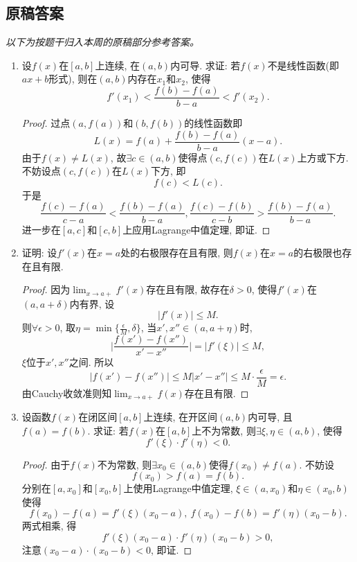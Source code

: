 \documentclass[UTF8,11pt, a4paper, oneside, fontset=none]{ctexbook}
\begin{document}
\clearpage

\subsection*{原稿答案}

\noindent\emph{以下为按题干归入本周的原稿部分参考答案。}

\begin{enumerate}
\item 设$f(x)$在$[a, b]$上连续, 在$(a, b)$内可导. 求证: 若$f(x)$不是线性函数(即$ax+b$形式), 则在$(a, b)$内存在$x_1$和$x_2$, 使得
\[
f'(x_1) < \frac{f(b) - f(a)}{b-a} < f'(x_2).
\]

\begin{proof}

过点$(a, f(a))$和$(b, f(b))$的线性函数即
\[
L(x) = f(a) + \frac{f(b) - f(a)}{b-a} (x-a).
\]
由于$f(x) \neq L(x)$, 故$\exists c \in (a, b)$使得点$(c, f(c))$在$L(x)$上方或下方. 不妨设点$(c, f(c))$在$L(x)$下方, 即
\[
f(c) < L(c).
\]
于是
\[
 \frac{f(c) - f(a)}{c-a} <  \frac{f(b) - f(a)}{b-a},  \frac{f(c) - f(b)}{c-b} >  \frac{f(b) - f(a)}{b-a}.
\]
进一步在$[a, c]$和$[c, b]$上应用Lagrange中值定理, 即证.

\end{proof}



\item 证明: 设$f'(x)$在$x=a$处的右极限存在且有限, 则$f(x)$在$x=a$的右极限也存在且有限.


\begin{proof}

因为$\lim_{x \to a+} f'(x)$存在且有限, 故存在$\delta> 0$, 使得$f'(x)$在$(a, a+\delta)$内有界, 设
\[
|f'(x)| \leq M.
\]
则$\forall \epsilon >0$, 取$\eta = \min \{ \frac{\epsilon}{M}, \delta \}$, 当$x', x'' \in (a, a + \eta)$时,
\[
\Big| \frac{f(x') - f(x'')}{x' - x''} \Big| = |f'(\xi)| \leq M,
\]
$\xi$位于$x', x''$之间. 所以
\[
|f(x') - f(x'')| \leq M|x' - x''| \leq M \cdot \frac{\epsilon}{M} = \epsilon.
\]
由Cauchy收敛准则知$\lim_{x \to a+}f(x)$存在且有限.
\end{proof}



\item 设函数$f(x)$在闭区间$[a, b]$上连续, 在开区间$(a, b)$内可导, 且$f(a) = f(b)$. 求证: 若$f(x)$在$[a, b]$上不为常数, 则$\exists \xi, \eta \in (a, b)$, 使得
\[
f'(\xi) \cdot f'(\eta) <0.
\]


\begin{proof}

由于$f(x)$不为常数, 则$\exists x_0 \in (a, b)$使得$f(x_0) \neq f(a)$. 不妨设
\[
f(x_0) > f(a) = f(b).
\]
分别在$[a, x_0]$和$[x_0, b]$上使用Lagrange中值定理, $\xi \in (a, x_0)$和$\eta \in (x_0, b)$使得
\[
f(x_0) - f(a) = f'(\xi) (x_0 - a), \ f(x_0) - f(b) = f'(\eta) (x_0 - b).
\]
两式相乘, 得
\[
f'(\xi) (x_0 - a) \cdot f'(\eta) (x_0 - b) >0,
\]
注意$(x_0 - a) \cdot (x_0 - b) < 0$, 即证.
\end{proof}
\end{enumerate}
\end{document}
